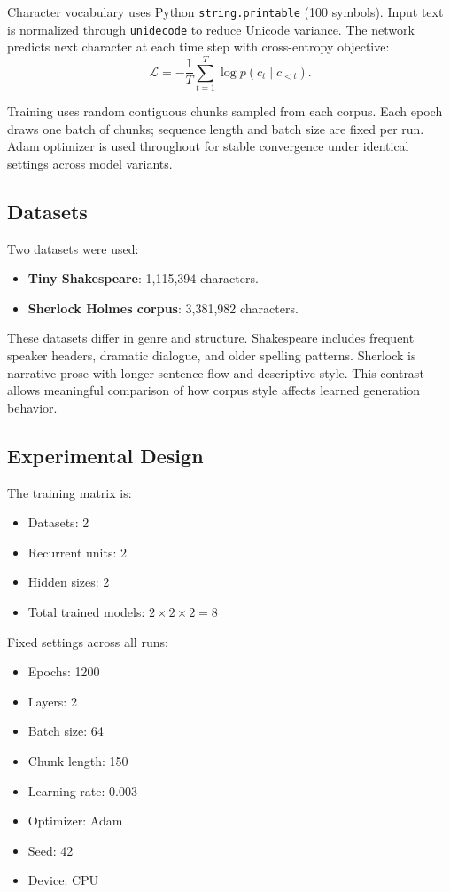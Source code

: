 \documentclass[10pt,twocolumn,letterpaper]{article}
\begin{document}
Character vocabulary uses Python \texttt{string.printable} (100 symbols). Input text is normalized through \texttt{unidecode} to reduce Unicode variance. The network predicts next character at each time step with cross-entropy objective:
\begin{equation}
\mathcal{L} = -\frac{1}{T}\sum_{t=1}^{T}\log p(c_t \mid c_{<t}).
\end{equation}

Training uses random contiguous chunks sampled from each corpus. Each epoch draws one batch of chunks; sequence length and batch size are fixed per run. Adam optimizer is used throughout for stable convergence under identical settings across model variants.

\subsection{Datasets}
Two datasets were used:
\begin{itemize}
\item \textbf{Tiny Shakespeare}: 1,115,394 characters.
\item \textbf{Sherlock Holmes corpus}: 3,381,982 characters.
\end{itemize}

These datasets differ in genre and structure. Shakespeare includes frequent speaker headers, dramatic dialogue, and older spelling patterns. Sherlock is narrative prose with longer sentence flow and descriptive style. This contrast allows meaningful comparison of how corpus style affects learned generation behavior.

\subsection{Experimental Design}
The training matrix is:
\begin{itemize}
\item Datasets: 2
\item Recurrent units: 2
\item Hidden sizes: 2
\item Total trained models: $2 \times 2 \times 2 = 8$
\end{itemize}

Fixed settings across all runs:
\begin{itemize}
\item Epochs: 1200
\item Layers: 2
\item Batch size: 64
\item Chunk length: 150
\item Learning rate: 0.003
\item Optimizer: Adam
\item Seed: 42
\item Device: CPU
\end{itemize}
\end{document}
